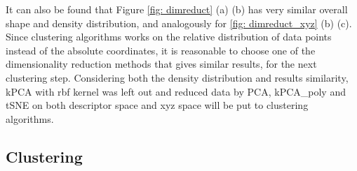 \documentclass[a4paper]{article}
\begin{document}
It can also be found that Figure \ref{fig: dimreduct} (a) (b) has very similar overall shape and density distribution, and analogously for \ref{fig: dimreduct_xyz} (b) (c). Since clustering algorithms works on the relative distribution of data points instead of the absolute coordinates, it is reasonable to choose one of the dimensionality reduction methods that gives similar results, for the next clustering step. Considering both the density distribution and results similarity, kPCA with rbf kernel was left out and reduced data by PCA, kPCA\_poly and tSNE on both descriptor space and xyz space will be put to clustering algorithms.

\subsection{Clustering}
\end{document}
